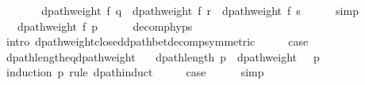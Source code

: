 \begin{isabellebody}
\ \ \isamarkupfalse%
\ \isamarkupfalse%
\ {\isachardoublequoteopen}{\isachardot}{\kern0pt}{\isachardot}{\kern0pt}{\isachardot}{\kern0pt}\ {\isasymle}\ dpath{\isacharunderscore}{\kern0pt}weight\ f\ q\ {\isacharplus}{\kern0pt}\ dpath{\isacharunderscore}{\kern0pt}weight\ f\ r\ {\isacharplus}{\kern0pt}\ dpath{\isacharunderscore}{\kern0pt}weight\ f\ s{\isachardoublequoteclose}\isanewline
\ \ \ \ \isamarkupfalse%
\ simp\isanewline
\ \ \isamarkupfalse%
\ \isamarkupfalse%
\ {\isachardoublequoteopen}{\isachardot}{\kern0pt}{\isachardot}{\kern0pt}{\isachardot}{\kern0pt}\ {\isacharequal}{\kern0pt}\ dpath{\isacharunderscore}{\kern0pt}weight\ f\ p{\isachardoublequoteclose}\isanewline
\ \ \ \ \isamarkupfalse%
\ decomp{\isachardot}{\kern0pt}hyps\isanewline
\ \ \ \ \isamarkupfalse%
\ {\isacharparenleft}{\kern0pt}intro\ dpath{\isacharunderscore}{\kern0pt}weight{\isacharunderscore}{\kern0pt}closed{\isacharunderscore}{\kern0pt}dpath{\isacharunderscore}{\kern0pt}bet{\isacharunderscore}{\kern0pt}decomp{\isacharbrackleft}{\kern0pt}symmetric{\isacharbrackright}{\kern0pt}{\isacharparenright}{\kern0pt}\isanewline
\ \ \isamarkupfalse%
\ \isamarkupfalse%
\ {\isacharquery}{\kern0pt}case\isanewline
\ \ \ \ \isacommand{{\isachardot}{\kern0pt}}\isamarkupfalse%
\isanewline
{}\isamarkupfalse%
%
\endisatagproof
{\isafoldproof}%
%
\isadelimproof
\isanewline
%
\endisadelimproof
\isanewline
{}\isamarkupfalse%
\ dpath{\isacharunderscore}{\kern0pt}length{\isacharunderscore}{\kern0pt}eq{\isacharunderscore}{\kern0pt}dpath{\isacharunderscore}{\kern0pt}weight{\isacharcolon}{\kern0pt}\isanewline
\ \ \ {\isachardoublequoteopen}dpath{\isacharunderscore}{\kern0pt}length\ p\ {\isacharequal}{\kern0pt}\ dpath{\isacharunderscore}{\kern0pt}weight\ {\isacharparenleft}{\kern0pt}{\isasymlambda}{\isacharunderscore}{\kern0pt}{\isachardot}{\kern0pt}\ {}{\isacharparenright}{\kern0pt}\ p{\isachardoublequoteclose}\isanewline
%
\isadelimproof
%
\endisadelimproof
%
\isatagproof
{}\isamarkupfalse%
\ {\isacharparenleft}{\kern0pt}induction\ p\ rule{\isacharcolon}{\kern0pt}\ dpath{\isacharunderscore}{\kern0pt}induct{\isacharparenright}{\kern0pt}\isanewline
{}\isamarkupfalse%
\ {}\isanewline
\ \ \isamarkupfalse%
\ {\isacharquery}{\kern0pt}case\isanewline
\ \ \ \ \isamarkupfalse%
\ simp\isanewline
{}\isamarkupfalse%
\isanewline

\end{isabellebody}
